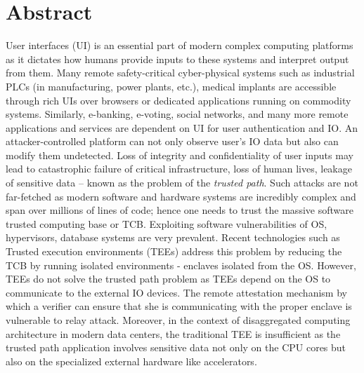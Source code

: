 \begingroup
\let\clearpage\relax
\let\cleardoublepage\relax
\let\cleardoublepage\relax

\chapter*{Abstract}

User interfaces (UI) is an essential part of modern complex computing platforms as it dictates how humans provide inputs to these systems and interpret output from them. Many remote safety-critical cyber-physical systems such as industrial PLCs (in manufacturing, power plants, etc.), medical implants are accessible through rich UIs over browsers or dedicated applications running on commodity systems. Similarly, e-banking, e-voting, social networks, and many more remote applications and services are dependent on UI for user authentication and IO. An attacker-controlled platform can not only observe user's IO data but also can modify them undetected. Loss of integrity and confidentiality of user inputs may lead to catastrophic failure of critical infrastructure, loss of human lives, leakage of sensitive data -- known as the problem of the \emph{trusted path}. Such attacks are not far-fetched as modern software and hardware systems are incredibly complex and span over millions of lines of code; hence one needs to trust the massive software trusted computing base or TCB. Exploiting software vulnerabilities of OS, hypervisors, database systems are very prevalent. Recent technologies such as Trusted execution environments (TEEs) address this problem by reducing the TCB by running isolated environments - enclaves isolated from the OS. However, TEEs do not solve the trusted path problem as TEEs depend on the OS to communicate to the external IO devices. The remote attestation mechanism by which a verifier can ensure that she is communicating with the proper enclave is vulnerable to relay attack. Moreover, in the context of disaggregated computing architecture in modern data centers, the traditional TEE is insufficient as the trusted path application involves sensitive data not only on the CPU cores but also on the specialized external hardware like accelerators.


